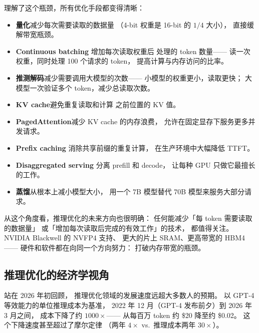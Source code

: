 理解了这个瓶颈，所有优化手段都变得清晰：
\begin{itemize}[noitemsep]
  \item \textbf{量化}减少每次需要读取的数据量
        （4-bit 权重是 16-bit 的 $1/4$ 大小），
        直接缓解带宽瓶颈。
  \item \textbf{Continuous batching} 增加每次读取权重后
        处理的 token 数量——
        读一次权重，同时处理 100 个请求的 token，
        提高计算与内存访问的比率。
  \item \textbf{推测解码}减少需要调用大模型的次数——
        小模型的权重更小，读取更快；
        大模型一次验证多个 token，减少总读取次数。
  \item \textbf{KV cache}避免重复读取和计算
        之前位置的 KV 值。
  \item \textbf{PagedAttention}减少 KV cache 的内存浪费，
        允许在固定显存下服务更多并发请求。
  \item \textbf{Prefix caching} 消除共享前缀的重复计算，
        在生产环境中大幅降低 TTFT。
  \item \textbf{Disaggregated serving} 分离 prefill 和 decode，
        让每种 GPU 只做它最擅长的工作。
  \item \textbf{蒸馏}从根本上减小模型大小，
        用一个 7B 模型替代 70B 模型来服务大部分请求。
\end{itemize}

从这个角度看，推理优化的未来方向也很明确：
任何能减少「每 token 需要读取的数据量」
或「增加每次读取后完成的有效工作」的技术，
都值得关注。
NVIDIA Blackwell 的 NVFP4 支持、
更大的片上 SRAM、更高带宽的 HBM4——
硬件和软件都在向同一个方向努力：
打破内存带宽的瓶颈。

\subsection{推理优化的经济学视角}

站在 2026 年初回顾，
推理优化领域的发展速度远超大多数人的预期。
以 GPT-4 等效能力的单位推理成本为基准，
2022 年 12 月（GPT-4 发布前夕）到 2026 年 3 月之间，
成本下降了约 $1000\times$——
从每百万 token 约 \$20 降至约 \$0.02。
这个下降速度甚至超过了摩尔定律
（两年 $4\times$ vs.\ 推理成本两年 $30\times$）。

